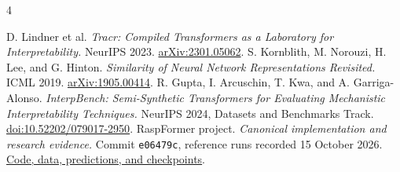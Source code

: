 \documentclass[11pt,a4paper]{article}
\begin{document}
\begin{thebibliography}{4}
\small\raggedright
{} D. Lindner et al. \emph{Tracr: Compiled Transformers as a Laboratory for Interpretability.} NeurIPS 2023. \href{https://arxiv.org/abs/2301.05062}{arXiv:2301.05062}.
 S. Kornblith, M. Norouzi, H. Lee, and G. Hinton. \emph{Similarity of Neural Network Representations Revisited.} ICML 2019. \href{https://arxiv.org/abs/1905.00414}{arXiv:1905.00414}.
 R. Gupta, I. Arcuschin, T. Kwa, and A. Garriga-Alonso. \emph{InterpBench: Semi-Synthetic Transformers for Evaluating Mechanistic Interpretability Techniques.} NeurIPS 2024, Datasets and Benchmarks Track. \href{https://doi.org/10.52202/079017-2950}{doi:10.52202/079017-2950}.
 RaspFormer project. \emph{Canonical implementation and research evidence.} Commit \texttt{e06479c}, reference runs recorded 15 October 2026. \href{https://github.com/raghulchandramouli/RaspFormer/tree/e06479ce09f10695aa5280162f80d880c060eaf5}{Code, data, predictions, and checkpoints}.
\end{thebibliography}
\end{document}
